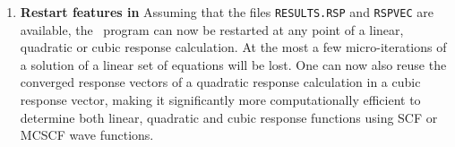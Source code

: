 \begin{enumerate}
\item {\bf Restart features in \resp } Assuming that the files
\verb|RESULTS.RSP| and \verb|RSPVEC| are available, the \resp\ program
can now be restarted at any point of a linear, quadratic or cubic
response calculation. At the most a few micro-iterations of a solution
of a linear set of equations will be lost. One can now also reuse the
converged response vectors of a quadratic response calculation in a
cubic response vector, making it significantly more computationally
efficient to determine both linear, quadratic and cubic response
functions using SCF or MCSCF wave functions.
\end{enumerate}

